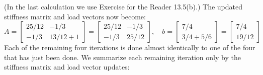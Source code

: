 \documentclass[../main.tex]{subfiles}
\begin{document}
(In the last calculation we use Exercise for the Reader 13.5(b).) The updated stiffness matrix and load vectors now become:
\\
$$
A=\left[\begin{array}{cc}
25 / 12 & -1 / 3 \\
-1 / 3 & 13 / 12+1
\end{array}\right]=\left[\begin{array}{cc}
25 / 12 & -1 / 3 \\
-1 / 3 & 25 / 12
\end{array}\right], \quad b=\left[\begin{array}{c}
7 / 4 \\
3 / 4+5 / 6
\end{array}\right]=\left[\begin{array}{c}
7 / 4 \\
19 / 12
\end{array}\right]
$$
Each of the remaining four iterations is done almost identically to one of the four that has just been done. We summarize each remaining iteration only by the stiffness matrix and load vector updates:
\\
\end{document}
